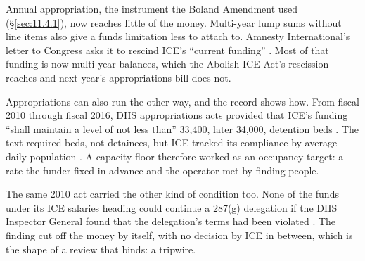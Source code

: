 Annual appropriation, the instrument the Boland Amendment used (\S\ref{sec:11.4.1}), now reaches little of the money. Multi-year lump sums without line items also give a funds limitation less to attach to. Amnesty International's letter to Congress asks it to rescind ICE's “current funding” \autocite{AmnestyUSA2026Letter}. Most of that funding is now multi-year balances, which the Abolish ICE Act's rescission reaches and next year's appropriations bill does not.

Appropriations can also run the other way, and the record shows how. From fiscal 2010 through fiscal 2016, DHS appropriations acts provided that ICE's funding “shall maintain a level of not less than” 33,400, later 34,000, detention beds \autocite{dhsapprop2010,Geng2018BedQuota}. The text required beds, not detainees, but ICE tracked its compliance by average daily population \autocite{Geng2018BedQuota}. A capacity floor therefore worked as an occupancy target: a rate the funder fixed in advance and the operator met by finding people.

The same 2010 act carried the other kind of condition too. None of the funds under its ICE salaries heading could continue a 287(g) delegation if the DHS Inspector General found that the delegation's terms had been violated \autocite{dhsapprop2010}. The finding cut off the money by itself, with no decision by ICE in between, which is the shape of a review that binds: a tripwire.
